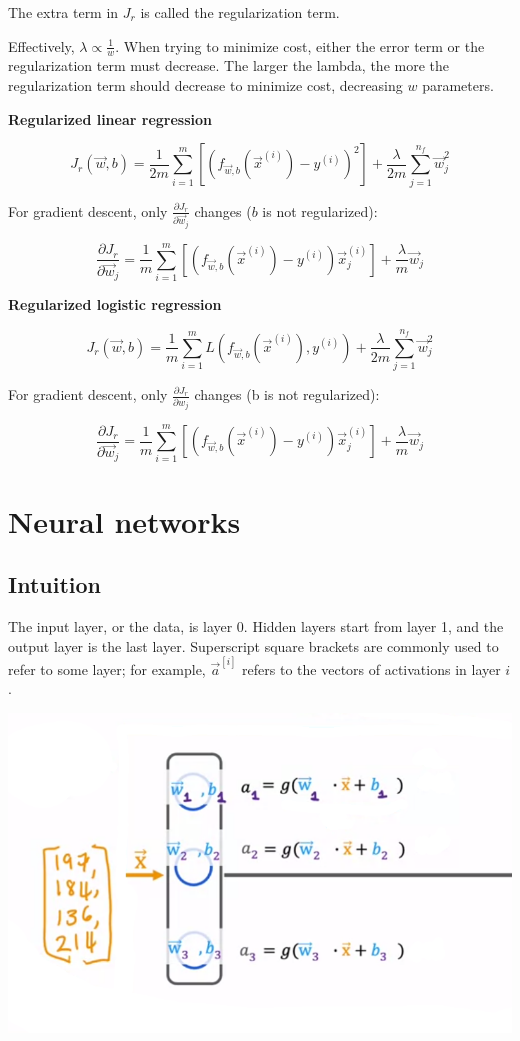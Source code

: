 \documentclass[12pt]{article}
\begin{document}
The extra term in $J_r$ is called the regularization term.

Effectively, $\lambda \propto \frac{1}{w}$. When trying to minimize cost, either the error term or the regularization term must decrease. The larger the lambda, the more the regularization term should decrease to minimize cost, decreasing $w$ parameters.

\noindent \textbf{Regularized linear regression}

\[ J_r(\vec{w},b) = \frac{1}{2m} \sum_{i=1}^m \left[(f_{\vec{w},b}(\vec{x}^{(i)}) - y^{(i)})^2\right] + \frac{\lambda}{2m} \sum_{j=1}^{n_f} \vec{w}_j^2 \]

For gradient descent, only $\frac{\partial J_r}{\partial \vec{w}_j}$ changes ($b$ is not regularized):

\[ \frac{\partial J_r}{\partial \vec{w}_j} = \frac{1}{m} \sum_{i=1}^m \left[(f_{\vec{w},b}(\vec x^{(i)}) - y^{(i)})\vec{x}^{(i)}_j\right] + \frac{\lambda}{m} \vec{w}_j \]

\noindent \textbf{Regularized logistic regression}

\[ J_r(\vec{w},b) = \frac{1}{m} \sum_{i=1}^m L(f_{\vec{w},b}(\vec{x}^{(i)}), y^{(i)}) + \frac{\lambda}{2m} \sum_{j=1}^{n_f} \vec{w}_j^2 \]

For gradient descent, only $\frac{\partial J_r}{\partial w_j}$ changes (b is not regularized):

\[ \frac{\partial J_r}{\partial \vec{w}_j} = \frac{1}{m} \sum_{i=1}^m \left[(f_{\vec{w},b}(\vec{x}^{(i)}) - y^{(i)})\vec{x}^{(i)}_j\right] + \frac{\lambda}{m} \vec{w}_j \]

\pagebreak

\section{Neural networks}

\subsection{Intuition}

The input layer, or the data, is layer 0. Hidden layers start from layer 1, and the
output layer is the last layer. Superscript square brackets are commonly used
to refer to some layer; for example, $\vec a^{[i]}$ refers to the vectors of
activations in layer $i$.

\includegraphics[scale=.5]{images/nn-intuition.png}
\end{document}
